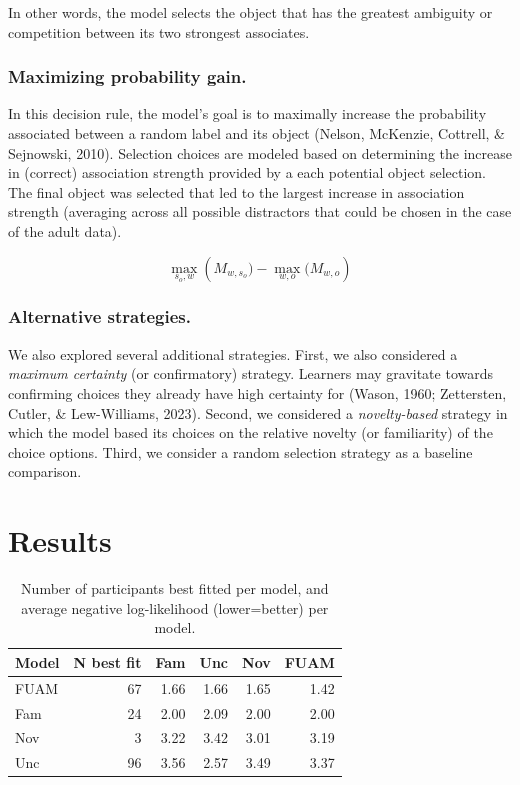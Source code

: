 \documentclass[10pt, letterpaper]{article}
\begin{document}
In other words, the model selects the object that has the greatest
ambiguity or competition between its two strongest associates.

\subsubsection{Maximizing probability
gain.}\label{maximizing-probability-gain.}

In this decision rule, the model's goal is to maximally increase the
probability associated between a random label and its object (Nelson,
McKenzie, Cottrell, \& Sejnowski, 2010). Selection choices are modeled
based on determining the increase in (correct) association strength
provided by a each potential object selection. The final object was
selected that led to the largest increase in association strength
(averaging across all possible distractors that could be chosen in the
case of the adult data).

\begin{equation}
\max_{s_o,w}({M_{w,s_o})- \max_{w,o}(M_{w,o}})
\label{eq:probability_gain}
\end{equation}

\subsubsection{Alternative strategies.}\label{alternative-strategies.}

We also explored several additional strategies. First, we also
considered a \emph{maximum certainty} (or confirmatory) strategy.
Learners may gravitate towards confirming choices they already have high
certainty for (Wason, 1960; Zettersten, Cutler, \& Lew-Williams, 2023).
Second, we considered a \emph{novelty-based} strategy in which the model
based its choices on the relative novelty (or familiarity) of the choice
options. Third, we consider a random selection strategy as a baseline
comparison.

\section{Results}\label{results}

\begin{table}[H]
\centering
\begin{tabular}{lrrrrr}
  \hline
Model & N best fit & Fam & Unc & Nov & FUAM \\
  \hline
FUAM &  67 & 1.66 & 1.66 & 1.65 & 1.42 \\
  Fam &  24 & 2.00 & 2.09 & 2.00 & 2.00 \\
  Nov &   3 & 3.22 & 3.42 & 3.01 & 3.19 \\
  Unc &  96 & 3.56 & 2.57 & 3.49 & 3.37 \\
   \hline
\end{tabular}
\caption{Number of participants best fitted per model, and average negative log-likelihood (lower=better) per model.}
\end{table}
\end{document}

